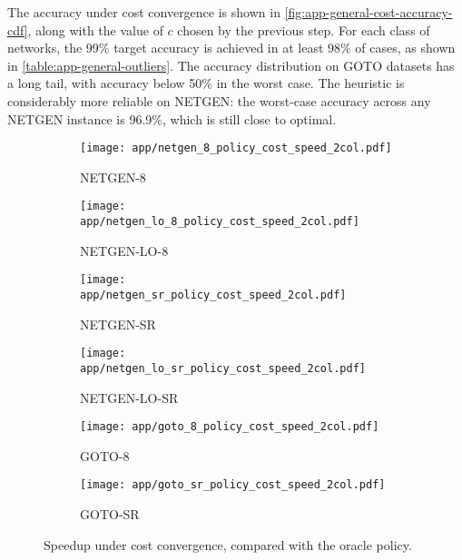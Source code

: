 The accuracy under cost convergence is shown in \cref{fig:app-general-cost-accuracy-cdf}, along with the value of $c$ chosen by the previous step. For each class of networks, the 99\% target accuracy is achieved in at least 98\% of cases, as shown in \cref{table:app-general-outliers}. The accuracy distribution on GOTO datasets has a long tail, with accuracy below 50\% in the worst case. The heuristic is considerably more reliable on NETGEN: the worst-case accuracy across any NETGEN instance is 96.9\%, which is still close to optimal.

\begin{figure}
    \begin{widepage}
        \begin{subfigure}[c]{0.5\textwidth}
            \texttt{[image: app/netgen\_8\_policy\_cost\_speed\_2col.pdf]}
            \caption{NETGEN-8}
        \end{subfigure}
        \begin{subfigure}[c]{0.5\textwidth}
            \texttt{[image: app/netgen\_lo\_8\_policy\_cost\_speed\_2col.pdf]}
            \caption{NETGEN-LO-8}
        \end{subfigure}
        \begin{subfigure}[c]{0.5\textwidth}
            \texttt{[image: app/netgen\_sr\_policy\_cost\_speed\_2col.pdf]}
            \caption{NETGEN-SR}
        \end{subfigure}
        \begin{subfigure}[c]{0.5\textwidth}
            \texttt{[image: app/netgen\_lo\_sr\_policy\_cost\_speed\_2col.pdf]}
            \caption{NETGEN-LO-SR}
        \end{subfigure}
        \begin{subfigure}[c]{0.5\textwidth}
            \texttt{[image: app/goto\_8\_policy\_cost\_speed\_2col.pdf]}
            \caption{GOTO-8}
        \end{subfigure}
        \begin{subfigure}[c]{0.5\textwidth}
            \texttt{[image: app/goto\_sr\_policy\_cost\_speed\_2col.pdf]}
            \caption{GOTO-SR}
        \end{subfigure}
    \end{widepage}
    \caption{Speedup under {\color{matplotlib_blue}cost convergence}, compared with the {\color{matplotlib_green}oracle policy}.}
    \label{fig:app-general-cost-speed-cdf}
\end{figure}

